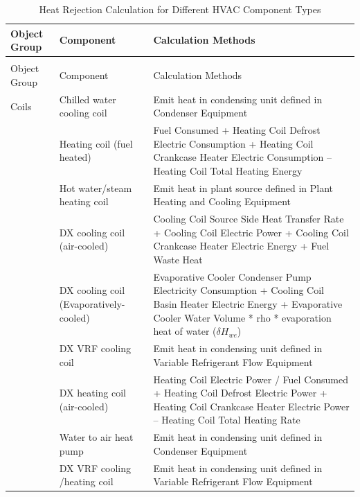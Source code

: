 \begin{longtable}[c]{p{1.0in}p{2.0in}p{3in}}
\caption{Heat Rejection Calculation for Different HVAC Component Types \label{table:emission-from-hvac-components}} \tabularnewline
\toprule 
Object Group & Component & Calculation Methods \tabularnewline
\midrule
\endfirsthead
\caption{Heat Rejection Calculation for Different HVAC Component Types} \tabularnewline
\toprule 
Object Group & Component & Calculation Methods \tabularnewline
\midrule
\endhead
Coils      & Chilled water cooling coil   & Emit heat in condensing unit defined in Condenser Equipment \tabularnewline
           & Heating coil (fuel heated)   & Fuel Consumed + Heating Coil Defrost Electric Consumption + Heating Coil Crankcase Heater Electric Consumption – Heating Coil Total Heating Energy \tabularnewline
           & Hot water/steam heating coil & Emit heat in plant source defined in Plant Heating and Cooling Equipment \tabularnewline
           & DX cooling coil (air-cooled) & Cooling Coil Source Side Heat Transfer Rate + Cooling Coil Electric Power + Cooling Coil Crankcase Heater Electric Energy + Fuel Waste Heat \tabularnewline
           & DX cooling coil (Evaporatively-cooled)  & Evaporative Cooler Condenser Pump Electricity Consumption + Cooling Coil Basin Heater Electric Energy + Evaporative Cooler Water Volume * rho * evaporation heat of water (\(\delta H_{we}\)) \tabularnewline
           & DX VRF cooling coil          & Emit heat in condensing unit defined in Variable Refrigerant Flow Equipment \tabularnewline
           & DX heating coil (air-cooled) & Heating Coil Electric Power / Fuel Consumed + Heating Coil Defrost Electric Power + Heating Coil Crankcase Heater Electric Power – Heating Coil Total Heating Rate \tabularnewline
           & Water to air heat pump       & Emit heat in condensing unit defined in Condenser Equipment \tabularnewline
           & DX VRF cooling /heating coil & Emit heat in condensing unit defined in Variable Refrigerant Flow Equipment \tabularnewline


\end{longtable}
